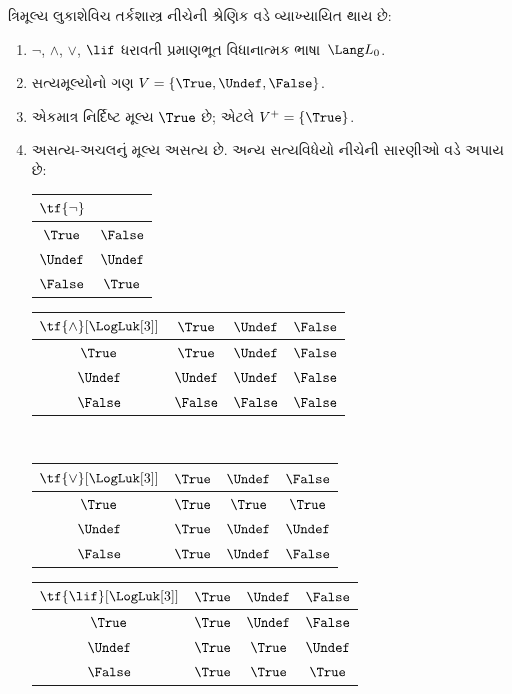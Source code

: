 \begin{defn}
ત્રિમૂલ્ય લુકાશેવિચ તર્કશાસ્ત્ર નીચેની શ્રેણિક વડે વ્યાખ્યાયિત થાય છે:
\begin{enumerate}
  \item $\lnot$, $\land$, $\lor$, $\lif$ ધરાવતી પ્રમાણભૂત
  વિધાનાત્મક ભાષા~$\Lang L_0$.
  \item સત્યમૂલ્યોનો ગણ $V = \{\True, \Undef, \False\}$.
  \item એકમાત્ર નિર્દિષ્ટ મૂલ્ય $\True$ છે; એટલે $V^+ = \{\True\}$.
  \item અસત્ય-અચલનું મૂલ્ય અસત્ય છે. અન્ય સત્યવિધેયો નીચેની
  સારણીઓ વડે અપાય છે:
  \begin{center}
    \begin{tabular}{c|c}
      $\tf{\lnot}$ & \\
      \hline
      $\True$ & $\False$ \\
      $\Undef$ & $\Undef$ \\
      $\False$ & $\True$
    \end{tabular}
    \quad
    \begin{tabular}{c|ccc}
      $\tf{\land}[\LogLuk[3]]$ & $\True$ & $\Undef$ & $\False$ \\
      \hline
      $\True$ & $\True$ & $\Undef$ & $\False$ \\
      $\Undef$ & $\Undef$ & $\Undef$ & $\False$\\
      $\False$ & $\False$ & $\False$ & $\False$
    \end{tabular}
    \\[2ex]
    \begin{tabular}{c|ccc}
      $\tf{\lor}[\LogLuk[3]]$ & $\True$ & $\Undef$ & $\False$ \\
      \hline
      $\True$ & $\True$ & $\True$ & $\True$ \\
      $\Undef$ & $\True$ & $\Undef$ & $\Undef$ \\
      $\False$ & $\True$ & $\Undef$ & $\False$
    \end{tabular}
    \quad
    \begin{tabular}{c|ccc}
      $\tf{\lif}[\LogLuk[3]]$ & $\True$ & $\Undef$ & $\False$ \\
      \hline
      $\True$ & $\True$ & $\Undef$ & $\False$ \\
      $\Undef$ & $\True$ & $\True$ & $\Undef$ \\
      $\False$ & $\True$ & $\True$ & $\True$
    \end{tabular}
  \end{center}
\end{enumerate}
\end{defn}

